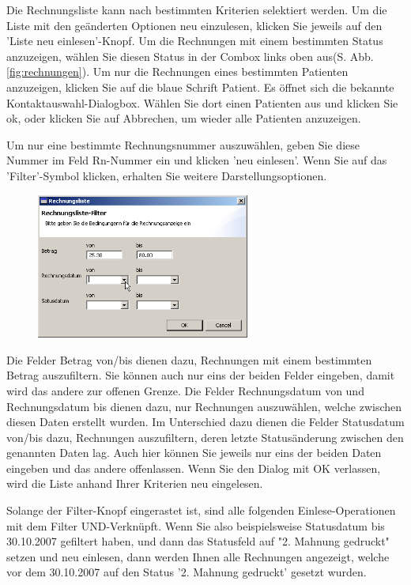 Die Rechnungsliste kann nach bestimmten Kriterien selektiert werden. Um die Liste mit den geänderten Optionen neu einzulesen, klicken Sie jeweils auf den 'Liste neu einlesen'-Knopf.
Um die Rechnungen mit einem bestimmten Status anzuzeigen, wählen Sie diesen Status in der Combox links oben aus(S. Abb. \ref{fig:rechnungen}). Um nur die Rechnungen eines bestimmten Patienten anzuzeigen, klicken Sie auf die blaue Schrift \glqq Patient\grqq{}. Es öffnet sich die bekannte Kontaktauswahl-Dialogbox. Wählen Sie dort einen Patienten aus und klicken Sie ok, oder klicken Sie auf Abbrechen, um wieder alle Patienten anzuzeigen.

Um nur eine bestimmte Rechnungsnummer auszuwählen, geben Sie diese Nummer im Feld Rn-Nummer ein und klicken 'neu einlesen'.
\medskip
Wenn Sie auf das 'Filter'-Symbol klicken, erhalten Sie weitere Darstellungsoptionen.

\begin{figure}
\includegraphics[width=7cm]{images/rechnungsfilter}
\end{figure}
Die Felder Betrag von/bis dienen dazu, Rechnungen mit einem bestimmten Betrag auszufiltern. Sie können auch nur eins der beiden Felder eingeben, damit wird das andere zur offenen Grenze.
Die Felder \glqq Rechnungsdatum von\grqq{} und \glqq Rechnungsdatum bis\grqq{} dienen dazu, nur Rechnungen auszuwählen, welche zwischen diesen Daten erstellt wurden. Im Unterschied dazu dienen die Felder \glqq Statusdatum von/bis\grqq{} dazu, Rechnungen auszufiltern, deren letzte Statusänderung zwischen den genannten Daten lag. Auch hier können Sie jeweils nur eins der beiden Daten eingeben und das andere offenlassen.
Wenn Sie den Dialog mit OK verlassen, wird die Liste anhand Ihrer Kriterien neu eingelesen.
\medskip

Solange der Filter-Knopf eingerastet ist, sind alle folgenden Einlese-Operationen mit dem Filter UND-Verknüpft. Wenn Sie also beispielsweise Statusdatum bis 30.10.2007 gefiltert haben, und dann das Statusfeld auf "2. Mahnung gedruckt" setzen und neu einlesen, dann werden Ihnen alle Rechnungen angezeigt, welche vor dem 30.10.2007 auf den Status '2. Mahnung gedruckt' gesetzt wurden.

